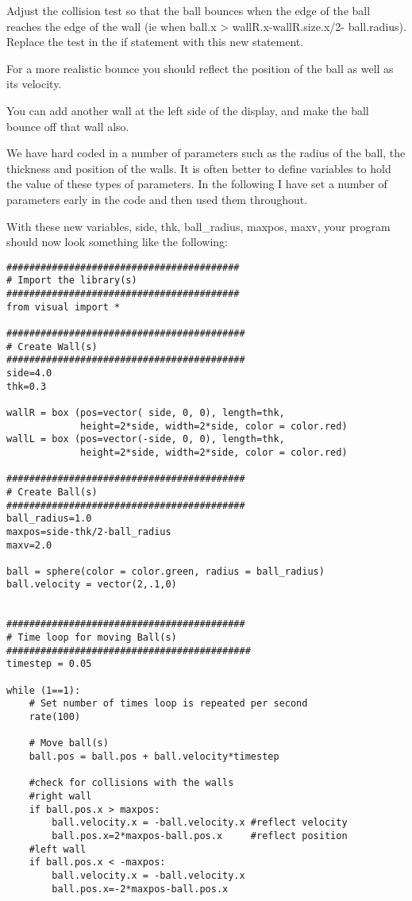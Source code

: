 \documentclass[12pt]{article}
\begin{document}
Adjust the collision test so that the ball bounces when the edge of the ball reaches
the edge of the wall (ie when {\color{code}ball.x  > wallR.x-wallR.size.x/2- ball.radius}).
Replace the test in the if statement with this new statement.

For a more realistic bounce you should reflect the position of the ball as well as its velocity.

You can add another wall at the left side of the display, and make the ball bounce off that wall also.

We have hard coded in a number of parameters such as the radius of the ball, the thickness and position of the walls. It is often better to define variables to hold the value of these types of parameters. In the following I have set a number of parameters early in the code and then used them throughout.

With these new variables, {\color{code}side, thk, ball\_radius, maxpos, maxv}, your program should now look something like the following:
{\color{code}
\begin{verbatim}
#########################################
# Import the library(s)
#########################################
from visual import *

##########################################
# Create Wall(s)
##########################################
side=4.0
thk=0.3

wallR = box (pos=vector( side, 0, 0), length=thk,
             height=2*side, width=2*side, color = color.red)
wallL = box (pos=vector(-side, 0, 0), length=thk,
             height=2*side, width=2*side, color = color.red)

##########################################
# Create Ball(s)
##########################################
ball_radius=1.0
maxpos=side-thk/2-ball_radius
maxv=2.0

ball = sphere(color = color.green, radius = ball_radius)
ball.velocity = vector(2,.1,0)


##########################################
# Time loop for moving Ball(s)
###########################################
timestep = 0.05

while (1==1):
    # Set number of times loop is repeated per second
    rate(100)

    # Move ball(s)
    ball.pos = ball.pos + ball.velocity*timestep

    #check for collisions with the walls
    #right wall
    if ball.pos.x > maxpos:
        ball.velocity.x = -ball.velocity.x #reflect velocity
        ball.pos.x=2*maxpos-ball.pos.x     #reflect position
    #left wall
    if ball.pos.x < -maxpos:
        ball.velocity.x = -ball.velocity.x
        ball.pos.x=-2*maxpos-ball.pos.x
\end{verbatim}}
\end{document}
